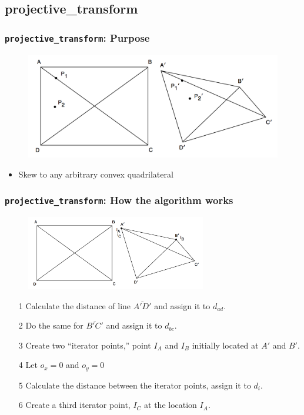 \documentclass{beamer}
\begin{document}
\subsection{projective\_transform}
\begin{frame}
	\frametitle{{\tt projective\_transform}: Purpose}
	\begin{figure}
		\centering
		\includegraphics[width=\textwidth]{../proposal/arbiskew_graphic.png}
	\end{figure}
	\begin{itemize}
		\item Skew to any arbitrary convex quadrilateral
	\end{itemize}
\end{frame}

\begin{frame}
	\frametitle{{\tt projective\_transform}: How the algorithm works}
	\begin{figure}
		\centering
		\includegraphics[width=0.7\textwidth]{images/arbiskew_graphic_with_iterators0.png}
	\end{figure}
	\begin{enumerate}
		\item[1] Calculate the distance of line $\overline{A\prime D\prime}$ and assign it to $d_{ad}$.
		\item[2] Do the same for $\overline{B\prime C\prime}$ and assign it to $d_{bc}$.
		\item[3] Create two ``iterator points,'' point $I_A$ and $I_B$ initially located at $A\prime$ and $B\prime$.
		\item[4] Let $o_x = 0$ and $o_y = 0$
		\item[5] Calculate the distance between the iterator points, assign it to $d_i$.
		\item[6] Create a third iterator point, $I_C$ at the location $I_A$.
	\end{enumerate}
\end{frame}
\end{document}
